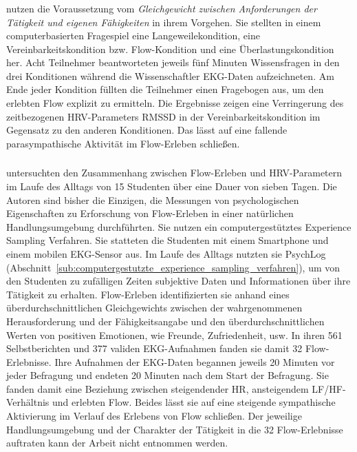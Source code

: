 
\subsubsection{\citet{Keller2011}} %
\label{ssub:keller2011}

\citet{Keller2011} nutzen die Voraussetzung vom \emph{Gleichgewicht zwischen Anforderungen der Tätigkeit und eigenen Fähigkeiten} in ihrem Vorgehen. Sie stellten in einem computerbasierten Fragespiel eine Langeweilekondition, eine Vereinbarkeitskondition bzw. Flow-Kondition und eine Überlastungskondition her. Acht Teilnehmer beantworteten jeweils fünf Minuten Wissensfragen in den drei Konditionen während die Wissenschaftler \ac{EKG}-Daten aufzeichneten. Am Ende jeder Kondition füllten die Teilnehmer einen Fragebogen \citep{Keller2008} aus, um den erlebten Flow explizit zu ermitteln. Die Ergebnisse zeigen eine Verringerung des zeitbezogenen \ac{HRV}-Parameters \acs{RMSSD} in der Vereinbarkeitskondition im Gegensatz zu den anderen Konditionen. Das lässt auf eine fallende parasympathische Aktivität im Flow-Erleben schließen.


\subsubsection{\citet{Gaggioli2013}} %
\label{ssub:gaggioli2013}

\citet{Gaggioli2013} untersuchten den Zusammenhang zwischen Flow-Erleben und \ac{HRV}-Parametern im Laufe des Alltags von 15 Studenten über eine Dauer von sieben Tagen. Die Autoren sind bisher die Einzigen, die Messungen von psychologischen Eigenschaften zu Erforschung von Flow-Erleben in einer natürlichen Handlungsumgebung durchführten. Sie nutzen ein computergestütztes Experience Sampling Verfahren. Sie statteten die Studenten mit einem Smartphone und einem mobilen \ac{EKG}-Sensor aus. Im Laufe des Alltags nutzten sie PsychLog (Abschnitt~\ref{sub:computergestutzte_experience_sampling_verfahren}), um von den Studenten zu zufälligen Zeiten subjektive Daten und Informationen über ihre Tätigkeit zu erhalten. Flow-Erleben identifizierten sie anhand eines überdurchschnittlichen Gleichgewichts zwischen der wahrgenommenen Herausforderung und der Fähigkeitsangabe und den überdurchschnittlichen Werten von positiven Emotionen, wie Freunde, Zufriedenheit, usw. In ihren 561 Selbstberichten und 377 validen \ac{EKG}-Aufnahmen fanden sie damit 32 Flow-Erlebnisse. Ihre Aufnahmen der \ac{EKG}-Daten begannen jeweils 20 Minuten vor jeder Befragung und endeten 20 Minuten nach dem Start der Befragung. Sie fanden damit eine Beziehung zwischen steigendender \ac{HR}, ansteigendem LF/HF-Verhältnis und erlebten Flow. Beides lässt sie auf eine steigende sympathische Aktivierung im Verlauf des Erlebens von Flow schließen. Der jeweilige Handlungsumgebung und der Charakter der Tätigkeit in die 32 Flow-Erlebnisse auftraten kann der Arbeit nicht entnommen werden. 

